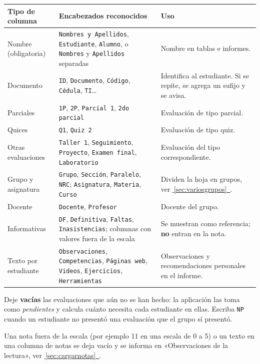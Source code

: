 \documentclass[11pt,letterpaper,oneside]{report}
\newcommand{\ver}[1]{\hyperref[#1]{\faArrowCircleRight\,\ref*{#1}~\nameref*{#1}}}
\newcommand{\col}[1]{\texttt{\small #1}}
\begin{document}
\begin{longtable}{>{\raggedright\arraybackslash}p{3.6cm}>{\raggedright\arraybackslash}p{6.2cm}>{\raggedright\arraybackslash}p{5.6cm}}
\toprule
\textbf{Tipo de columna} & \textbf{Encabezados reconocidos} & \textbf{Uso}\\\midrule\endhead
Nombre (obligatoria) & \col{Nombres y Apellidos}, \col{Estudiante}, \col{Alumno}, o \col{Nombres} y \col{Apellidos} separadas & Nombre en tablas e informes.\\
Documento & \col{ID}, \col{Documento}, \col{Código}, \col{Cédula}, \col{TI}… & Identifica al estudiante. Si se repite, se agrega un sufijo y se avisa.\\
Parciales & \col{1P}, \col{2P}, \col{Parcial 1}, \col{2do parcial} & Evaluación de tipo parcial.\\
Quices & \col{Q1}, \col{Quiz 2} & Evaluación de tipo quiz.\\
Otras evaluaciones & \col{Taller 1}, \col{Seguimiento}, \col{Proyecto}, \col{Examen final}, \col{Laboratorio} & Evaluación del tipo correspondiente.\\
Grupo y asignatura & \col{Grupo}, \col{Sección}, \col{Paralelo}, \col{NRC}; \col{Asignatura}, \col{Materia}, \col{Curso} & Dividen la hoja en grupos, ver \ver{sec:variosgrupos}.\\
Docente & \col{Docente}, \col{Profesor} & Docente del grupo.\\
Informativas & \col{DF}, \col{Definitiva}, \col{Faltas}, \col{Inasistencias}; columnas con valores fuera de la escala & Se muestran como referencia; \textbf{no} entran en la nota.\\
Texto por estudiante & \col{Observaciones}, \col{Competencias}, \col{Páginas web}, \col{Videos}, \col{Ejercicios}, \col{Herramientas} & Observaciones y recomendaciones personales en el informe.\\
\bottomrule
\end{longtable}

\begin{consejo}
Deje \textbf{vacías} las evaluaciones que aún no se han hecho: la aplicación las toma como \emph{pendientes} y calcula cuánto necesita cada estudiante en ellas. Escriba \col{NP} cuando un estudiante no presentó una evaluación que el grupo sí presentó.
\end{consejo}
\begin{atencion}
Una nota fuera de la escala (por ejemplo 11 en una escala de 0 a 5) o un texto en una columna de notas se deja vacío y se informa en «Observaciones de la lectura», ver \ver{sec:cargarnotas}.
\end{atencion}
\end{document}
